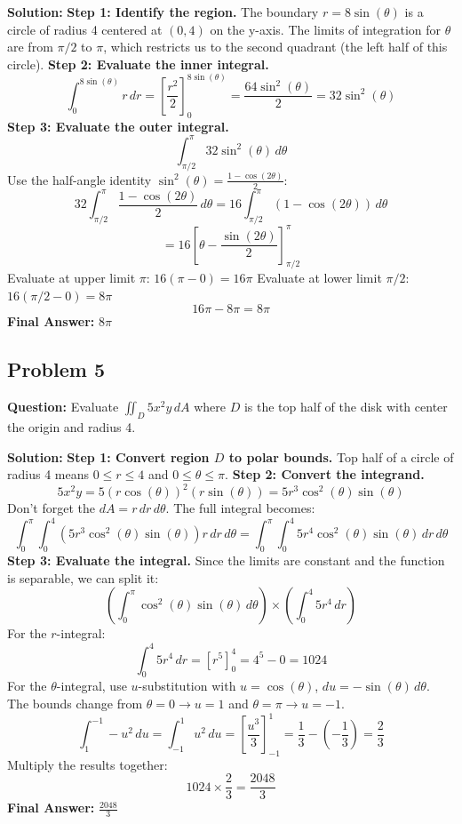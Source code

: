 \documentclass[12pt]{article}
\begin{document}
\textbf{Solution:}
\textbf{Step 1: Identify the region.}
The boundary $r = 8\sin(\theta)$ is a circle of radius 4 centered at $(0, 4)$ on the y-axis. The limits of integration for $\theta$ are from $\pi/2$ to $\pi$, which restricts us to the second quadrant (the left half of this circle).
\textbf{Step 2: Evaluate the inner integral.}
\[ \int_0^{8\sin(\theta)} r \, dr = \left[ \frac{r^2}{2} \right]_0^{8\sin(\theta)} = \frac{64\sin^2(\theta)}{2} = 32\sin^2(\theta) \]
\textbf{Step 3: Evaluate the outer integral.}
\[ \int_{\pi/2}^{\pi} 32\sin^2(\theta) \, d\theta \]
Use the half-angle identity $\sin^2(\theta) = \frac{1 - \cos(2\theta)}{2}$:
\[ 32 \int_{\pi/2}^{\pi} \frac{1 - \cos(2\theta)}{2} \, d\theta = 16 \int_{\pi/2}^{\pi} (1 - \cos(2\theta)) \, d\theta \]
\[ = 16 \left[ \theta - \frac{\sin(2\theta)}{2} \right]_{\pi/2}^{\pi} \]
Evaluate at upper limit $\pi$: $16(\pi - 0) = 16\pi$
Evaluate at lower limit $\pi/2$: $16(\pi/2 - 0) = 8\pi$
\[ 16\pi - 8\pi = 8\pi \]
\textbf{Final Answer:} $8\pi$

\subsection*{Problem 5}
\textbf{Question:} Evaluate $\iint_D 5x^2y \, dA$ where $D$ is the top half of the disk with center the origin and radius 4.

\textbf{Solution:}
\textbf{Step 1: Convert region $D$ to polar bounds.}
Top half of a circle of radius 4 means $0 \le r \le 4$ and $0 \le \theta \le \pi$.
\textbf{Step 2: Convert the integrand.}
\[ 5x^2y = 5(r\cos(\theta))^2(r\sin(\theta)) = 5r^3\cos^2(\theta)\sin(\theta) \]
Don't forget the $dA = r \, dr \, d\theta$.
The full integral becomes:
\[ \int_0^{\pi} \int_0^4 \left( 5r^3\cos^2(\theta)\sin(\theta) \right) r \, dr \, d\theta = \int_0^{\pi} \int_0^4 5r^4\cos^2(\theta)\sin(\theta) \, dr \, d\theta \]
\textbf{Step 3: Evaluate the integral.}
Since the limits are constant and the function is separable, we can split it:
\[ \left( \int_0^{\pi} \cos^2(\theta)\sin(\theta) \, d\theta \right) \times \left( \int_0^4 5r^4 \, dr \right) \]
For the $r$-integral:
\[ \int_0^4 5r^4 \, dr = \left[ r^5 \right]_0^4 = 4^5 - 0 = 1024 \]
For the $\theta$-integral, use $u$-substitution with $u = \cos(\theta)$, $du = -\sin(\theta) \, d\theta$.
The bounds change from $\theta = 0 \to u = 1$ and $\theta = \pi \to u = -1$.
\[ \int_1^{-1} -u^2 \, du = \int_{-1}^1 u^2 \, du = \left[ \frac{u^3}{3} \right]_{-1}^1 = \frac{1}{3} - \left(-\frac{1}{3}\right) = \frac{2}{3} \]
Multiply the results together:
\[ 1024 \times \frac{2}{3} = \frac{2048}{3} \]
\textbf{Final Answer:} $\frac{2048}{3}$
\end{document}
